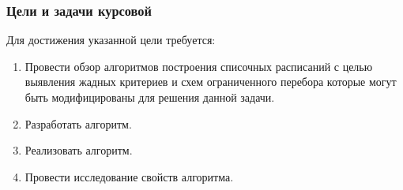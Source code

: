 \begin{frame}
    \frametitle{Цели и задачи курсовой}
    Для достижения указанной цели требуется:
    \begin{enumerate}
        \item Провести обзор алгоритмов построения списочных расписаний с целью выявления жадных критериев и схем ограниченного перебора которые могут быть модифицированы для решения данной задачи.
        \item Разработать алгоритм.
        \item Реализовать алгоритм.
        \item Провести исследование свойств алгоритма.
    \end{enumerate}
\end{frame}
